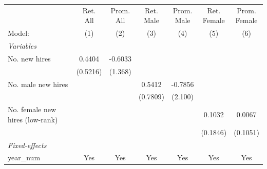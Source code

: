 \begin{table}[htbp]
\begin{threeparttable}
\begin{tabular}{lcccccc}
   \tabularnewline \midrule \midrule
                                                       & \makecell{Ret.\\All}    & \makecell{Prom.\\All}    & \makecell{Ret.\\Male}    & \makecell{Prom.\\Male}    & \makecell{Ret.\\Female}    & \makecell{Prom.\\Female} \\      
   Model:                                              & (1)                     & (2)                      & (3)                      & (4)                       & (5)                        & (6)\\  
   \midrule
   \emph{Variables}\\
   No. new hires                                       & 0.4404                  & -0.6033                  &                          &                           &                            &   \\   
                                                       & (0.5216)                & (1.368)                  &                          &                           &                            &   \\   
   No. male new hires                                  &                         &                          & 0.5412                   & -0.7856                   &                            &   \\   
                                                       &                         &                          & (0.7809)                 & (2.100)                   &                            &   \\   
   No. female new hires (low-rank)                     &                         &                          &                          &                           & 0.1032                     & 0.0067\\   
                                                       &                         &                          &                          &                           & (0.1846)                   & (0.1051)\\   
   \midrule
   \emph{Fixed-effects}\\
   year\_num                                           & Yes                     & Yes                      & Yes                      & Yes                       & Yes                        & Yes\\  

\end{tabular}
\end{threeparttable}
\end{table}
